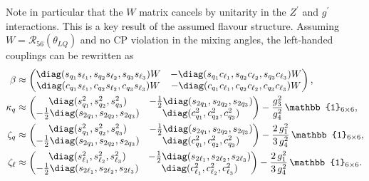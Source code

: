 Note in particular that the $W$ matrix cancels by unitarity in the $Z^\prime$ and $g^\prime$ interactions. This is a key result of the assumed flavour structure. Assuming $W=\mathcal{R}_{56}(\theta_{LQ})$ and no CP violation in the mixing angles, the left-handed couplings can be rewritten as
\begin{align}\label{eq:Beta}
\beta &\approx
\begin{pmatrix}
  \diag( s_{q_1}s_{\ell_1}, s_{q_2}s_{\ell_2}, s_{q_3}s_{\ell_3} ) W& -\diag( s_{q_1}c_{\ell_1}, s_{q_2}c_{\ell_2}, s_{q_3}c_{\ell_3} ) W \\
  \diag( c_{q_1}s_{\ell_1}, c_{q_2}s_{\ell_2}, c_{q_3}s_{\ell_3} ) W & -\diag( c_{q_1}c_{\ell_1}, c_{q_2}c_{\ell_2}, c_{q_3}c_{\ell_3} ) W
\end{pmatrix},
\\
\kappa_q &\approx
\begin{pmatrix}
  \diag( s_{q_1}^2, s_{q_2}^2, s_{q_3}^2 ) & -\frac{1}{2}\diag( s_{2q_1}, s_{2q_2}, s_{2q_3} ) \\
  -\frac{1}{2}\diag( s_{2q_1}, s_{2q_2}, s_{2q_3} )  & \diag( c_{q_1}^2, c_{q_2}^2, c_{q_3}^2 )
\end{pmatrix}
-\frac{g_3^2}{g_4^2}\,\mathbb{1}_{6\times6},
\\
\zeta_q &\approx
\begin{pmatrix}
  \diag( s_{q_1}^2, s_{q_2}^2, s_{q_3}^2 ) & -\frac{1}{2}\diag( s_{2q_1}, s_{2q_2}, s_{2q_3} ) \\
  -\frac{1}{2}\diag( s_{2q_1}, s_{2q_2}, s_{2q_3} )  & \diag( c_{q_1}^2, c_{q_2}^2, c_{q_3}^2 )
\end{pmatrix}
-\frac{2\,g_1^2}{3\,g_4^2}\,\mathbb{1}_{6\times6},
\\
\zeta_\ell &\approx
\begin{pmatrix}
  \diag( s_{\ell_1}^2, s_{\ell_2}^2, s_{\ell_3}^2 ) & -\frac{1}{2}\diag( s_{2\ell_1}, s_{2\ell_2}, s_{2\ell_3} ) \\
  -\frac{1}{2}\diag( s_{2\ell_1}, s_{2\ell_2}, s_{2\ell_3} )  & \diag( c_{\ell_1}^2, c_{\ell_2}^2, c_{\ell_3}^2 )
\end{pmatrix}
-\frac{2\,g_1^2}{3\,g_4^2}\,\mathbb{1}_{6\times6}.
\label{eq:LLmbE}
\end{align}

